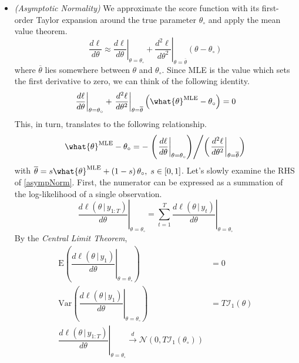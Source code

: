 \documentclass[answers]{exam}
\begin{document}
\begin{questions}
\begin{solution}
\begin{enumerate}[a)]
\begin{itemize}
      \item \emph{(Asymptotic Normality)} We approximate the score function with its first-order Taylor expansion around the true parameter $\theta_{\circ}$ and apply the mean value theorem.
      \begin{equation}
        \dfrac{d\ell}{d\theta} \approx \left.\dfrac{d\ell}{d\theta}\right|_{\theta=\theta_{\circ}}+\left.\dfrac{d^{2}\ell}{d\theta^{2}}\right|_{\theta=\overline{\theta}}\left(\theta-\theta_{\circ}\right)
      \end{equation}
      where $\overline{\theta}$ lies somewhere between $\theta$ and $\theta_{\circ}$. Since MLE is the value which sets the first derivative to zero, we can think of the following identity.
      \begin{equation}
        \left.\dfrac{d\ell}{d\theta}\right|_{\theta=\theta_{\circ}}+\left.\dfrac{d^{2}\ell}{d\theta^{2}}\right|_{\theta=\overline{\theta}}\left(\what{\theta}^{\text{MLE}}-\theta_{\circ}\right)=0
      \end{equation}
      This, in turn, translates to the following relationship.
      \begin{equation}\label{asympNorm}
        \what{\theta}^{\text{MLE}}-\theta_{\circ} =-\left.\left(\left.\dfrac{d\ell}{d\theta}\right|_{\theta=\theta_{\circ}}\right)\middle/\left(\left.\dfrac{d^{2}\ell}{d\theta^{2}}\right|_{\theta=\overline{\theta}}\right)\right.
      \end{equation}
      with $\overline{\theta} = s\what{\theta}^{\text{MLE}}+\left(1-s\right)\theta_{\circ},\; s\in\left[0,1\right]$. Let's slowly examine the RHS of \ref{asympNorm}. First, the numerator can be expressed as a summation of the log-likelihood of a single observation.
      \begin{equation}
        \left.\dfrac{d\ell\left(\theta\,|\,y_{1:T}\right)}{d\theta}\right|_{\theta=\theta_{\circ}} = \sum_{t=1}^{T}\left.\dfrac{d\ell\left(\theta\,|\,y_{t}\right)}{d\theta}\right|_{\theta=\theta_{\circ}}
      \end{equation}
      By the \emph{Central Limit Theorem},
      \begin{align}\label{CLT}
        \mathrm{E}\left(\left.\dfrac{d\ell\left(\theta\,|\,y_{1}\right)}{d\theta}\right|_{\theta=\theta_{\circ}}\right) &= 0\\
        \mathrm{Var}\left(\left.\dfrac{d\ell\left(\theta\,|\,y_{1}\right)}{d\theta}\right|_{\theta=\theta_{\circ}}\right) &= T\mathcal{I}_{1}\left(\theta\right)\\
        \left.\dfrac{d\ell\left(\theta\,|\,y_{1:T}\right)}{d\theta}\right|_{\theta=\theta_{\circ}} \xrightarrow{d} \mathcal{N}\left(0,T\mathcal{I}_{1}\left(\theta_{\circ}\right)\right)

\end{align}
\end{itemize}
\end{enumerate}
\end{solution}
\end{questions}
\end{document}
